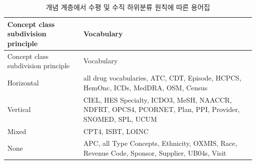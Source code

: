 \documentclass[10.5pt]{book}
\theoremstyle{definition}
\theoremstyle{definition}
\theoremstyle{definition}
\theoremstyle{remark}
\begin{document}
\begin{longtable}[]{@{}ll@{}}
\caption{\label{tab:sublassification}개념 계층에서 수평 및 수직 하위분류
원칙에 따른 용어집}\tabularnewline
\toprule
\begin{minipage}[b]{0.13\columnwidth}\raggedright\strut
Concept class subdivision principle\strut
\end{minipage} & \begin{minipage}[b]{0.47\columnwidth}\raggedright\strut
Vocabulary\strut
\end{minipage}\tabularnewline
\midrule
\endfirsthead
\toprule
\begin{minipage}[b]{0.13\columnwidth}\raggedright\strut
Concept class subdivision principle\strut
\end{minipage} & \begin{minipage}[b]{0.47\columnwidth}\raggedright\strut
Vocabulary\strut
\end{minipage}\tabularnewline
\midrule
\endhead
\begin{minipage}[t]{0.13\columnwidth}\raggedright\strut
Horizontal\strut
\end{minipage} & \begin{minipage}[t]{0.47\columnwidth}\raggedright\strut
all drug vocabularies, ATC, CDТ, Episode, HCPCS, HemOnc, ICDs, MedDRA,
OSM, Census\strut
\end{minipage}\tabularnewline
\begin{minipage}[t]{0.13\columnwidth}\raggedright\strut
Vertical\strut
\end{minipage} & \begin{minipage}[t]{0.47\columnwidth}\raggedright\strut
CIEL, HES Specialty, ICDO3, MeSH, NAACCR, NDFRT, OPCS4, PCORNET, Plan,
PPI, Provider, SNOMED, SPL, UCUM\strut
\end{minipage}\tabularnewline
\begin{minipage}[t]{0.13\columnwidth}\raggedright\strut
Mixed\strut
\end{minipage} & \begin{minipage}[t]{0.47\columnwidth}\raggedright\strut
CPT4, ISBT, LOINC\strut
\end{minipage}\tabularnewline
\begin{minipage}[t]{0.13\columnwidth}\raggedright\strut
None\strut
\end{minipage} & \begin{minipage}[t]{0.47\columnwidth}\raggedright\strut
APC, all Type Concepts, Ethnicity, OXMIS, Race, Revenue Code, Sponsor,
Supplier, UB04s, Visit\strut
\end{minipage}\tabularnewline
\bottomrule
\end{longtable}
\end{document}
